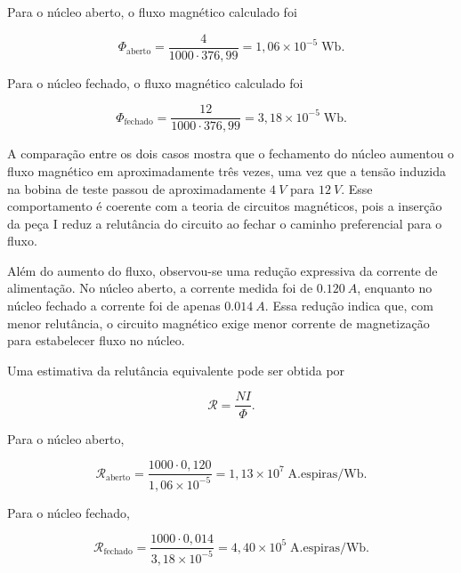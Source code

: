 \documentclass[11pt,a4paper]{article}
\begin{document}
Para o núcleo aberto, o fluxo magnético calculado foi

\begin{equation}
    \Phi_{\text{aberto}} = 
    \frac{4}{1000 \cdot 376,99} = 1,06 \times 10^{-5} \; \text{Wb}. 
    \label{eq:fluxo_aberto} 
\end{equation}

Para o núcleo fechado, o fluxo magnético calculado foi

\begin{equation} 
    \Phi_{\text{fechado}} = 
    \frac{12}{1000 \cdot 376,99} = 3,18 \times 10^{-5} \; 
    \text{Wb}. 
    \label{eq:fluxo_fechado} 
\end{equation}

A comparação entre os dois casos mostra que o fechamento do núcleo aumentou o fluxo magnético em aproximadamente três vezes, uma vez que a tensão induzida na bobina de teste passou de aproximadamente \(\SI{4}{V}\) para \(\SI{12}{V}\). Esse comportamento é coerente com a teoria de circuitos magnéticos, pois a inserção da peça I reduz a relutância do circuito ao fechar o caminho preferencial para o fluxo.

Além do aumento do fluxo, observou-se uma redução expressiva da corrente de alimentação. No núcleo aberto, a corrente medida foi de \(\SI{0,120}{A}\), enquanto no núcleo fechado a corrente foi de apenas \(\SI{0,014}{A}\). Essa redução indica que, com menor relutância, o circuito magnético exige menor corrente de magnetização para estabelecer fluxo no núcleo.

Uma estimativa da relutância equivalente pode ser obtida por

\begin{equation} 
    \mathcal{R} = \frac{N I}{\Phi}. 
    \label{eq:relutancia_exp} 
\end{equation}

Para o núcleo aberto,

\begin{equation} 
    \mathcal{R}_{\text{aberto}} = 
    \frac{1000 \cdot 0,120}{1,06 \times 10^{-5}} = 
    1,13 \times 10^{7} 
    \; \text{A.espiras/Wb}. 
    \label{eq:relutancia_aberto} 
\end{equation}

Para o núcleo fechado, 

\begin{equation} 
    \mathcal{R}_{\text{fechado}} = 
    \frac{1000 \cdot 0,014}{3,18 \times 10^{-5}} =
    4,40 \times 10^{5} 
    \; \text{A.espiras/Wb}. 
    \label{eq:relutancia_fechado} 
\end{equation}
\end{document}
